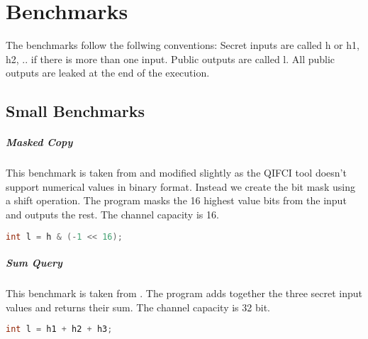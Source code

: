 \chapter{Benchmarks}\label{ch:benchmarks}
The benchmarks follow the follwing conventions: Secret inputs are called h or h1, h2, .. if there is more than one input. Public outputs are called l. All public outputs are leaked at the end of the execution.





\section{Small Benchmarks}

\paragraph{Masked Copy}
This benchmark is taken from \cite{meng11} and modified slightly as the QIFCI tool doesn't support numerical values in binary format. Instead we create the bit mask using a shift operation. The program masks the 16 highest value bits from the input and outputs the rest. The channel capacity is 16.

\begin{center}
    \begin{lstlisting}[language=C, caption=Masked Copy, captionpos=b]
int l = h & (-1 << 16);
    \end{lstlisting}
\end{center}


\paragraph{Sum Query}
This benchmark is taken from \cite{backes09}. The program adds together the three secret input values and returns their sum. The channel capacity is 32 bit.

\begin{center}
    \begin{lstlisting}[language=C, caption=Sum Query, captionpos=b]
int l = h1 + h2 + h3;
    \end{lstlisting}
\end{center}


